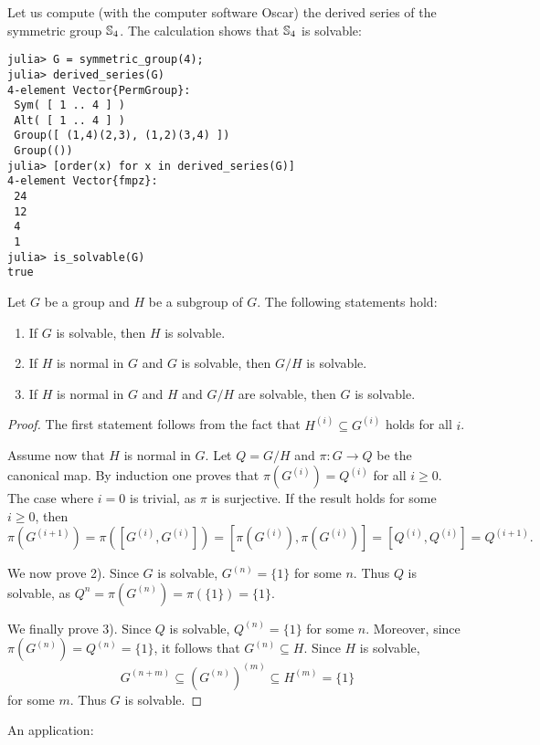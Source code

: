Let us compute (with the computer software Oscar) 
the derived series of the symmetric group
$\mathbb{S}_4$. The calculation shows that $\mathbb{S}_4$ is solvable: 
\begin{lstlisting}
julia> G = symmetric_group(4);
julia> derived_series(G)
4-element Vector{PermGroup}:
 Sym( [ 1 .. 4 ] )
 Alt( [ 1 .. 4 ] )
 Group([ (1,4)(2,3), (1,2)(3,4) ])
 Group(())
julia> [order(x) for x in derived_series(G)]
4-element Vector{fmpz}:
 24
 12
 4
 1
julia> is_solvable(G)
true
\end{lstlisting}

\begin{proposition}
\label{pro:solvable}
    Let $G$ be a group and $H$ be a subgroup of $G$. 
    The following statements hold:
    \begin{enumerate}
        \item If $G$ is solvable, then $H$ is solvable.
        \item If $H$ is normal in $G$ and $G$ is solvable, then $G/H$ is solvable. 
        \item If $H$ is normal in $G$ and $H$ and $G/H$ are solvable, then $G$ is solvable. 
    \end{enumerate}
\end{proposition}

\begin{proof}
    The first statement follows from the fact that
    $H^{(i)}\subseteq G^{(i)}$ holds for all $i$. 
 
    Assume now that $H$ is normal in $G$. 
    Let $Q=G/H$ and $\pi\colon G\to Q$ be the canonical map.
    By induction one proves that $\pi(G^{(i)})=Q^{(i)}$ for all $i\geq0$.
    The case where $i=0$ is trivial, as $\pi$ is surjective. 
    If the result holds for some $i\geq0$, then
    \[
            \pi(G^{(i+1)})=\pi([G^{(i)},G^{(i)}])=[\pi(G^{(i)}),\pi(G^{(i)})]=[Q^{(i)},Q^{(i)}]=Q^{(i+1)}.
    \]

    We now prove 2). Since $G$ is solvable, $G^{(n)}=\{1\}$ for some $n$. 
    Thus $Q$ is solvable, as $Q^{n}=\pi(G^{(n)})=\pi(\{1\})=\{1\}$. 

    We finally prove 3). 
    Since $Q$ is solvable, $Q^{(n)}=\{1\}$ for some $n$.
    Moreover, since $\pi(G^{(n)})=Q^{(n)}=\{1\}$, it follows that
    $G^{(n)}\subseteq H$. Since $H$
    is solvable, 
    \[
        G^{(n+m)}\subseteq (G^{(n)})^{(m)}\subseteq H^{(m)}=\{1\}
    \]
    for some $m$. Thus $G$ is solvable.
\end{proof}

An application:

